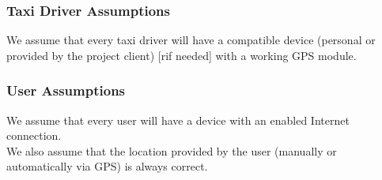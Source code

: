 \documentclass[12pt, a4paper]{article}
\begin{document}
\subsubsection{Taxi Driver Assumptions} 
We assume that every taxi driver will have a compatible device (personal or provided by the project client) [rif needed] with a working GPS module.
\subsubsection{User Assumptions} 
\label{ssub:user_assumptions}
We assume that every user will have a device with an enabled Internet connection.\\
We also assume that the location provided by the user (manually or automatically via GPS) is always correct.
\end{document}
